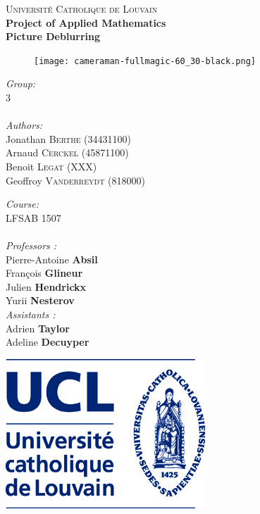 \begin{titlepage}
\begin{center}
\textsc{\Large Université Catholique de Louvain}\\[0.5cm]
{\Large \bfseries Project of Applied Mathematics}\\
{\huge \bfseries Picture Deblurring
}\\
\end{center}
\vfill
\begin{figure}[h!]
\texttt{[image: cameraman-fullmagic-60\_30-black.png]}
\centering
\end{figure}
\vfill
\begin{minipage}{0.5\textwidth}
\begin{flushleft} \large
\emph{Group:} \\
3\\
~\\
\emph{Authors:}\\
Jonathan \textsc{Berthe} (34431100)\\
Arnaud \textsc{Cerckel} (45871100)\\
Benoit \textsc{Legat} (XXX)\\
Geoffroy \textsc{Vanderreydt} (818000)\\
\end{flushleft}
\end{minipage}
\begin{minipage}{0.5\textwidth}
\begin{flushright} \large
\emph{Course:} \\
LFSAB 1507\\
~\\
\emph{Professors :} \\
Pierre-Antoine \textbf{Absil}\\
François \textbf{Glineur}\\
Julien \textbf{Hendrickx}\\
Yurii \textbf{Nesterov}\\
\emph{Assistants :}\\
Adrien \textbf{Taylor}\\
Adeline \textbf{Decuyper}
\end{flushright}
\end{minipage}
\vfill
\begin{center}
\begin{minipage}{0.25\textwidth}
\begin{flushleft}
\includegraphics[scale=0.25]{Couverture/ucl-logo.jpg}

\end{flushleft}
\end{minipage}
\end{center}
\end{titlepage}
